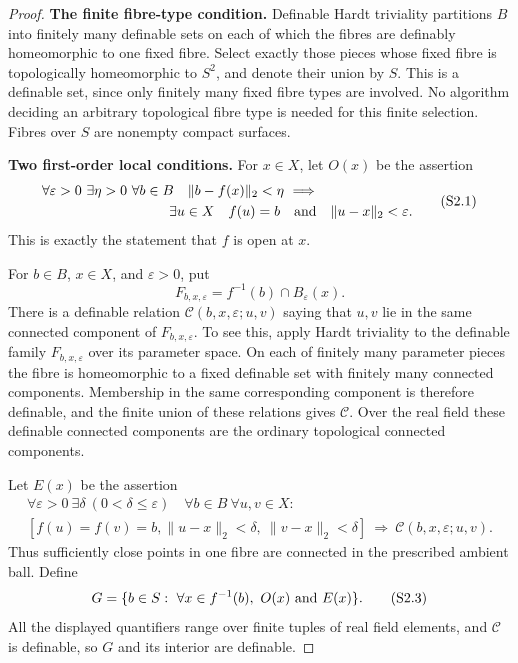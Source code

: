 \begin{proof}
\textbf{The finite fibre-type condition.}\quad
Definable Hardt triviality partitions $B$ into finitely many definable
sets on each of which the fibres are definably homeomorphic to one fixed
fibre. Select exactly those pieces whose fixed fibre is topologically
homeomorphic to $S^2$, and denote their union by $S$. This is a definable
set, since only finitely many fixed fibre types are involved. No
algorithm deciding an arbitrary topological fibre type is needed for
this finite selection. Fibres over $S$ are nonempty compact surfaces.

\textbf{Two first-order local conditions.}\quad
For $x\in X$, let $O(x)$ be the assertion
\[
 \begin{split}
 \forall\varepsilon>0\ \exists\eta>0\ \forall b\in B\quad
 \|b-f(x)\|_2<\eta\ \Longrightarrow\qquad\qquad\qquad\quad\\
 \exists u\in X\quad f(u)=b\quad\hbox{and}\quad
                                  \|u-x\|_2<\varepsilon.
 \end{split}
 \tag{S2.1}
\]
This is exactly the statement that $f$ is open at $x$.

For $b\in B$, $x\in X$, and $\varepsilon>0$, put
\[
 F_{b,x,\varepsilon}=f^{-1}(b)\cap B_{\varepsilon}(x).
\]
There is a definable relation
$\mathcal C(b,x,\varepsilon;u,v)$ saying that $u,v$ lie in the same
connected component of $F_{b,x,\varepsilon}$. To see this, apply Hardt
triviality to the definable family $F_{b,x,\varepsilon}$ over its
parameter space. On each of finitely many parameter pieces the fibre
is homeomorphic to a fixed definable set with finitely many connected
components. Membership in the same corresponding component is therefore
definable, and the finite union of these relations gives $\mathcal C$.
Over the real field these definable connected components are the
ordinary topological connected components.

Let $E(x)$ be the assertion
\[
 \begin{split}
 \forall\varepsilon>0\ \exists\delta\ (0<\delta\le\varepsilon)\quad
 \forall b\in B\ \forall u,v\in X:\qquad\qquad\qquad\quad\\
 [f(u)=f(v)=b, \|u-x\|_2<\delta,\ \|v-x\|_2<\delta]
 \ \Longrightarrow\ \mathcal C(b,x,\varepsilon;u,v).
 \end{split}
 \tag{S2.2}
\]
Thus sufficiently close points in one fibre are connected in the
prescribed ambient ball. Define
\[
 G=\{b\in S:\ \forall x\in f^{-1}(b),\ O(x)\ \hbox{and}\ E(x)\}.
 \tag{S2.3}
\]
All the displayed quantifiers range over finite tuples of real field
elements, and $\mathcal C$ is definable, so $G$ and its interior are
definable.


\end{proof}
